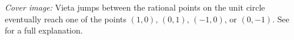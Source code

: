 \vspace*{\fill}
\noindent
\textit{Cover image:} Vieta jumps between the rational points on the unit circle eventually reach one of the points $(1,0)$, $(0,1)$, $(-1,0)$, or $(0,-1)$. See  for a full explanation.
